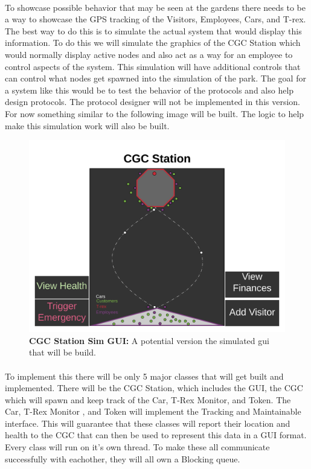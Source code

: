 \documentclass[12pt]{article}
\begin{document}
\paragraph{} To showcase possible behavior that may be seen at the gardens there needs to be a way to showcase 
the GPS tracking of the Visitors, Employees, Cars, and T-rex. The best way to do this is to simulate the actual system 
that would display this information. To do this we will simulate the graphics of the CGC Station which would normally display active nodes
and also act as a way for an employee to control aspects of the system. This simulation will have additional controls that
can control what nodes get spawned into the simulation of the park. The goal for a system like this would be to test the behavior of the protocols 
and also help design protocols. The protocol designer will not be implemented in this version. For now something similar to the following image will be built.
The logic to help make this simulation work will also be built.

\begin{figure}[H]
    \centerline{\includegraphics[scale=.10]{CGCStationGUI.png}}
    \caption{\textbf{CGC Station Sim GUI: } A potential version the simulated gui that will be build.}
    \label{fig:CGCStationGUI}
\end{figure}

\paragraph{} To implement this there will be only 5 major classes that will get built and implemented. There 
will be the CGC Station, which includes the GUI, the CGC which will spawn and keep track of the Car, T-Rex Monitor, and Token.
The Car, T-Rex Monitor , and Token will implement the Tracking and Maintainable interface. This will guarantee that 
these classes will report their location and health to the CGC that can then be used to represent this data in a GUI format.
Every class will run on it's own thread. To make these all communicate successfully with eachother, they will all own a Blocking queue. 
\end{document}
